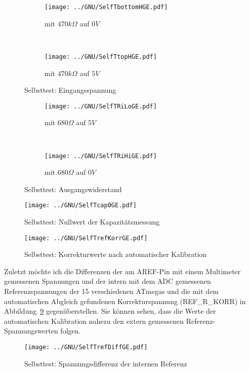 \begin{figure}[H]
  \begin{subfigure}[b]{.5\textwidth}
  \centering
    \texttt{[image: ../GNU/SelfTbottomHGE.pdf]}
    \caption{mit \(470k\Omega\) auf \(0V\)}
    \label{fig:SelfTlowH}
  \end{subfigure}
  ~
  \begin{subfigure}[b]{.5\textwidth}
  \centering
    \texttt{[image: ../GNU/SelfTtopHGE.pdf]}
    \caption{mit \(470k\Omega\) auf \(5V\)}
    \label{fig:SelfTtopH}
  \end{subfigure}
  \caption{Selbsttest: Eingangsspannung}
\end{figure}

\begin{figure}[H]
  \begin{subfigure}[b]{.5\textwidth}
  \centering
    \texttt{[image: ../GNU/SelfTRiLoGE.pdf]}
    \caption{mit \(680\Omega\) auf \(5V\)}
    \label{fig:SelfTRoL}
  \end{subfigure}
  ~
  \begin{subfigure}[b]{.5\textwidth}
  \centering
    \texttt{[image: ../GNU/SelfTRiHiGE.pdf]}
    \caption{mit \(680\Omega\) auf \(0V\)}
    \label{fig:SelfTRoH}
  \end{subfigure}
  \caption{Selbsttest: Ausgangswiderstand}
\end{figure}

\begin{figure}[H]
  \centering
  \texttt{[image: ../GNU/SelfTcap0GE.pdf]}
  \caption{Selbsttest: Nullwert der Kapazitätsmessung}
  \label{fig:SelfTcap}
\end{figure}

\begin{figure}[H]
  \centering
  \texttt{[image: ../GNU/SelfTrefKorrGE.pdf]}
  \caption{Selbsttest: Korrekturwerte nach automatischer Kalibration}
  \label{fig:SelfTrefKorr}
\end{figure}

Zuletzt möchte ich die Differenzen der am AREF-Pin mit einem Multimeter
gemessenen Spannungen und der intern mit dem ADC gemessenen Referenzspannungen der
15 verschiedenen ATmegas und die mit dem automatischen Abgleich
gefundenen Korrekturspannung (REF\_R\_KORR) in Abbildung~\ref{fig:SelfTrefDiff} gegenüberstellen.
Sie können sehen, dass die Werte der automatischen Kalibration nahezu den extern
gemessenen Referenz-Spannungswerten folgen.

\begin{figure}[H]
  \centering
  \texttt{[image: ../GNU/SelfTrefDiffGE.pdf]}
  \caption{Selbsttest: Spannungsdifferenz der internen Referenz}
  \label{fig:SelfTrefDiff}
\end{figure}


